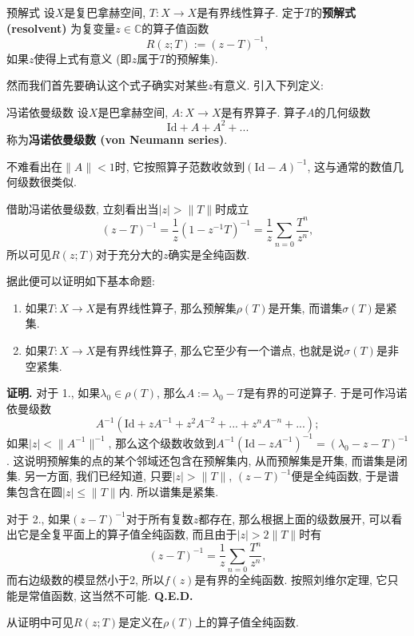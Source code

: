 

\begin{definition}{预解式}
设$X$是复巴拿赫空间, $T:X\to X$是有界线性算子. 定于$T$的\textbf{预解式 (resolvent)} 为复变量$z\in\mathbb{C}$的算子值函数
$$
R(z;T):=(z-T)^{-1},
$$
如果$z$使得上式有意义 (即$z$属于$T$的预解集).
\end{definition}

然而我们首先要确认这个式子确实对某些$z$有意义. 引入下列定义:

\begin{definition}{冯诺依曼级数}
设$X$是巴拿赫空间, $A:X\to X$是有界算子. 算子$A$的几何级数
$$
\text{Id}+A+A^2+...
$$
称为\textbf{冯诺依曼级数 (von Neumann series)}.
\end{definition}
不难看出在$\|A\|<1$时, 它按照算子范数收敛到$(\text{Id}-A)^{-1}$, 这与通常的数值几何级数很类似. 

借助冯诺依曼级数, 立刻看出当$|z|>\|T\|$时成立
$$
(z-T)^{-1}
=\frac{1}{z}(1-z^{-1}T)^{-1}
=\frac{1}{z}\sum_{n=0}\frac{T^n}{z^n},
$$
所以可见$R(z;T)$对于充分大的$z$确实是全纯函数.

据此便可以证明如下基本命题:

\begin{theorem}{}
\begin{enumerate}
\item 如果$T:X\to X$是有界线性算子, 那么预解集$\rho(T)$是开集, 而谱集$\sigma(T)$是紧集.
\item 如果$T:X\to X$是有界线性算子, 那么它至少有一个谱点, 也就是说$\sigma(T)$是非空紧集.
\end{enumerate}
\end{theorem}
\textbf{证明.} 
对于 1., 如果$\lambda_0\in\rho(T)$, 那么$A:=\lambda_0-T$是有界的可逆算子. 于是可作冯诺依曼级数
$$
A^{-1}(\text{Id}+zA^{-1}+z^2A^{-2}+...+z^nA^{-n}+...);
$$
如果$|z|<\|A^{-1}\|^{-1}$, 那么这个级数收敛到$A^{-1}(\text{Id}-zA^{-1})^{-1}=(\lambda_0-z-T)^{-1}$. 这说明预解集的点的某个邻域还包含在预解集内, 从而预解集是开集, 而谱集是闭集. 另一方面, 我们已经知道, 只要$|z|>\|T\|$, $(z-T)^{-1}$便是全纯函数, 于是谱集包含在圆$|z|\leq\|T\|$内. 所以谱集是紧集.

对于 2., 如果$(z-T)^{-1}$对于所有复数$z$都存在, 那么根据上面的级数展开, 可以看出它是全复平面上的算子值全纯函数, 而且由于$|z|>2\|T\|$时有
$$
(z-T)^{-1}=\frac{1}{z}\sum_{n=0}\frac{T^n}{z^n},
$$
而右边级数的模显然小于2, 所以$f(z)$是有界的全纯函数. 按照刘维尔定理, 它只能是常值函数, 这当然不可能. \textbf{Q.E.D.}

从证明中可见$R(z;T)$是定义在$\rho(T)$上的算子值全纯函数.